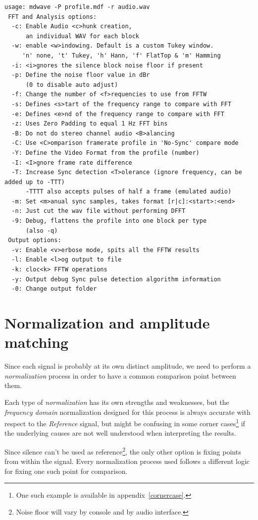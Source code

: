 \documentclass[10pt,a4paper]{report}
\begin{document}
\begin{appendices}
\begin{verbatim}
usage: mdwave -P profile.mdf -r audio.wav
 FFT and Analysis options:
  -c: Enable Audio <c>hunk creation,
      an individual WAV for each block
  -w: enable <w>indowing. Default is a custom Tukey window.
     'n' none, 't' Tukey, 'h' Hann, 'f' FlatTop & 'm' Hamming
  -i: <i>gnores the silence block noise floor if present
  -p: Define the noise floor value in dBr
      (0 to disable auto adjust)
  -f: Change the number of <f>requencies to use from FFTW
  -s: Defines <s>tart of the frequency range to compare with FFT
  -e: Defines <e>nd of the frequency range to compare with FFT
  -z: Uses Zero Padding to equal 1 Hz FFT bins
  -B: Do not do stereo channel audio <B>alancing
  -C: Use <C>omparison framerate profile in 'No-Sync' compare mode
  -Y: Define the Video Format from the profile (number)
  -I: <I>gnore frame rate difference
  -T: Increase Sync detection <T>olerance (ignore frequency, can be added up to -TTT)
      -TTTT also accepts pulses of half a frame (emulated audio)
  -m: Set <m>anual sync samples, takes format [r|c]:<start>:<end>
  -n: Just cut the wav file without performing DFFT
  -9: Debug, flattens the profile into one block per type
      (also -q)
 Output options:
  -v: Enable <v>erbose mode, spits all the FFTW results
  -l: Enable <l>og output to file
  -k: cloc<k> FFTW operations
  -y: Output debug Sync pulse detection algorithm information
  -0: Change output folder
\end{verbatim}

\chapter{Normalization and amplitude matching}
\label{normalization}

Since each signal is probably at its own distinct amplitude, we need to perform a \textit{normalization} process in order to have a common comparison point between them.

Each type of \textit{normalization} has its own strengths and weaknesses, but the \textit{frequency domain} normalization designed for this process is always accurate with respect to the \textit{Reference} signal, but might be confusing in some corner cases\footnote{One such example is available in appendix~\ref{cornercase}.} if the underlying causes are not well understood when interpreting the results.

Since silence can't be used as reference\footnote{Noise floor will vary by console and by audio interface.}, the only other option is fixing points from within the signal. Every normalization process used follows a different logic for fixing one such point for comparison.


\end{appendices}
\end{document}
